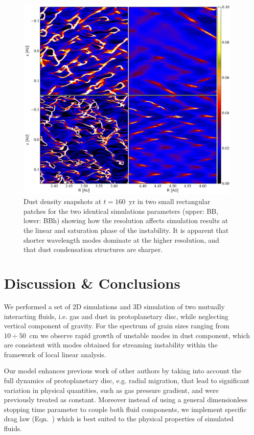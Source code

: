 \begin{figure}
   \includegraphics[width=0.98\linewidth]{figures/fig10}
   \caption{Dust density snapshots at $t = 160$~yr in two small rectangular
      patches for the two identical simulations parameters (upper: BB, lower:
      BBh) showing how the resolution affects simulation results at the linear
      and saturation phase of the instability. It is apparent that shorter
      wavelength modes dominate at the higher resolution, and that dust
      condensation structures are sharper.
   } 
   \label{fig10} 
\end{figure}
%
\section{Discussion \& Conclusions}
\label{sec:conclusions}
We performed a set of 2D simulations and 3D simulation of two mutually
interacting fluids, i.e. gas and dust in protoplanetary disc, while neglecting
vertical component of gravity. For the spectrum of grain sizes ranging from
$10\div50$~cm we observe rapid growth of unstable modes in dust component, which
are consistent with modes obtained for streaming instability within the
framework of local linear analysis.

Our model enhances previous work of other authors by taking into account the
full dynamics of protoplanetary disc, e.g. radial migration, that lead to
significant variation in physical quantities, such as gas pressure gradient, and
were previously treated as constant. Moreover instead of using a general
dimensionless stopping time parameter to couple both fluid components, we
implement specific drag law (Eqn.~) which is best suited to the
physical properties of simulated fluids.

